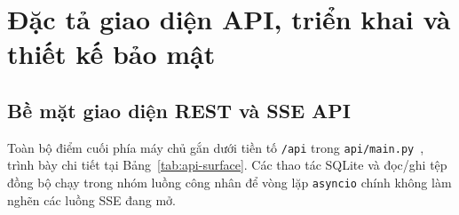 \section{Đặc tả giao diện API, triển khai và thiết kế bảo mật}

\subsection{Bề mặt giao diện REST và SSE API}

Toàn bộ điểm cuối phía máy chủ gắn dưới tiền tố \texttt{/api} trong \texttt{api/\allowbreak{}main.py}~\cite{fastapi}, trình bày chi tiết tại Bảng~\ref{tab:api-surface}. Các thao tác SQLite và đọc/ghi tệp đồng bộ chạy trong nhóm luồng công nhân để vòng lặp \texttt{asyncio} chính không làm nghẽn các luồng SSE đang mở.

